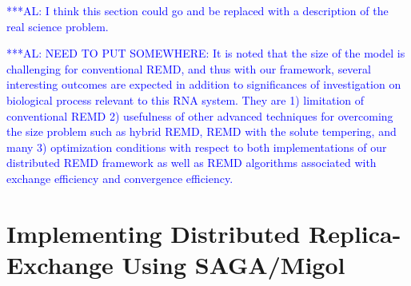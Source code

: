 \documentclass{rspublic}
\newcommand{\alnote}[1]{ {\textcolor{blue} { ***AL: #1 }}}
\newcommand{\alnote}[1]{}
\begin{document}



\alnote{I think this section could go and be replaced with a
  description of the real science problem.}  




\alnote{NEED TO PUT SOMEWHERE: It is noted that the size of the model
  is challenging for conventional REMD, and thus with our framework,
  several interesting outcomes are expected in addition to
  significances of investigation on biological process relevant to
  this RNA system. They are 1) limitation of conventional REMD 2)
  usefulness of other advanced techniques for overcoming the size
  problem such as hybrid REMD, REMD with the solute tempering, and
  many 3) optimization conditions with respect to both implementations
  of our distributed REMD framework as well as REMD algorithms
  associated with exchange efficiency and convergence efficiency.  }

\section{Implementing Distributed Replica-Exchange Using SAGA/Migol}
\label{sec:remd_impl}
\end{document}
